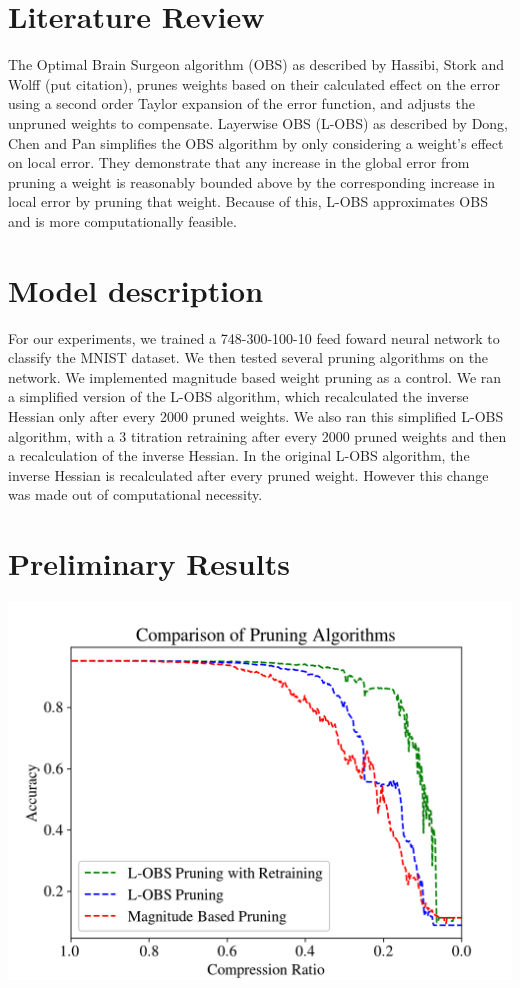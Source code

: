 \documentclass{article}
\begin{document}
\section{Literature Review}
\label{Literature Review}
The Optimal Brain Surgeon algorithm (OBS) as described by Hassibi, Stork and Wolff (put citation), prunes weights based on their calculated effect on the error using a second order Taylor expansion of the error function, and adjusts the unpruned weights to compensate. Layerwise OBS (L-OBS) as described by Dong, Chen and Pan simplifies the OBS algorithm by only considering a weight's effect on local error. They demonstrate that any increase in the global error from pruning a weight is reasonably bounded above by the corresponding increase in local error by pruning that weight. Because of this, L-OBS approximates OBS and is more computationally feasible.

\section{Model description}
\label{Model description} For our experiments, we trained a 748-300-100-10 feed foward neural network to classify the MNIST dataset. We then tested several pruning algorithms on the network. We implemented magnitude based weight pruning as a control. We ran a simplified version of the L-OBS algorithm, which recalculated the inverse Hessian only after every 2000 pruned weights. We also ran this simplified L-OBS algorithm, with a 3 titration retraining after every 2000 pruned weights and then a recalculation of the inverse Hessian. In the original L-OBS algorithm, the inverse Hessian is recalculated after every pruned weight. However this change was made out of computational necessity.

\section{Preliminary Results}
\label{Preliminary Results}

\includegraphics[scale=0.65]{Comparison}
\end{document}
